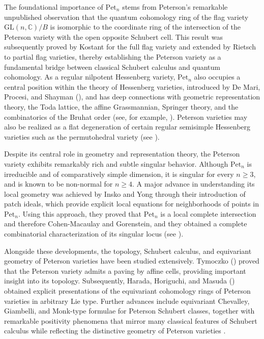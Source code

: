 \documentclass[12pt, reqno]{amsart}
\theoremstyle{plain}
\numberwithin{equation}{section}
\theoremstyle{definition}
\begin{document}
The foundational importance of $\mathrm{Pet}_n$ stems from Peterson's remarkable unpublished observation that the quantum cohomology ring of the flag variety $\mathrm{GL}(n,\mathbb{C})/B$ is isomorphic to the coordinate ring of the intersection of the Peterson variety with the open opposite Schubert cell. This result was subsequently proved by Kostant \cite{Kos} for the full flag variety and extended by Rietsch \cite{Riet} to partial flag varieties, thereby establishing the Peterson variety as a fundamental bridge between classical Schubert calculus and quantum cohomology. As a regular nilpotent Hessenberg variety, $\mathrm{Pet}_n$ also occupies a central position within the theory of Hessenberg varieties, introduced by De Mari, Procesi, and Shayman (\cite{MPS}), and has deep connections with geometric representation theory, the Toda lattice, the affine Grassmannian, Springer theory, and the combinatorics of the Bruhat order (see, for example, \cite{Bal, Kos, Riet}). Peterson varieties may also be realized as a flat degeneration of certain regular semisimple Hessenberg varieties such as the permutohedral variety (see \cite{AFZ}).

Despite its central role in geometry and representation theory, the Peterson variety exhibits remarkably rich and subtle singular behavior. Although $\mathrm{Pet}_n$ is irreducible and of comparatively simple dimension, it is singular for every $n\ge 3$, and is known to be non-normal for $n\ge 4$. A major advance in understanding its local geometry was achieved by Insko and Yong through their introduction of patch ideals, which provide explicit local equations for neighborhoods of points in $\mathrm{Pet}_n$. Using this approach, they proved that $\mathrm{Pet}_n$ is a local complete intersection and therefore Cohen-Macaulay and Gorenstein, and they obtained a complete combinatorial characterization of its singular locus (see \cite{Insko}).

Alongside these developments, the topology, Schubert calculus, and equivariant geometry of Peterson varieties have been studied extensively. Tymoczko (\cite{Tymoczko}) proved that the Peterson variety admits a paving by affine cells, providing important insight into its topology. Subsequently, Harada, Horiguchi, and Masuda (\cite{HHM}) obtained explicit presentations of the equivariant cohomology rings of Peterson varieties in arbitrary Lie type. Further advances include equivariant Chevalley, Giambelli, and Monk-type formulae for Peterson Schubert classes, together with remarkable positivity phenomena that mirror many classical features of Schubert calculus while reflecting the distinctive geometry of Peterson varieties \cite{D, GMS, HT}.
\end{document}
